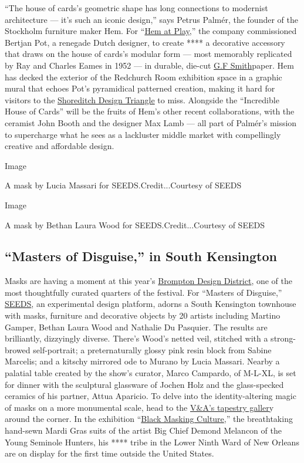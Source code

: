 ``The house of cards's geometric shape has long connections to modernist
architecture --- it's such an iconic design,'' says Petrus Palmér, the
founder of the Stockholm furniture maker Hem. For
``\href{https://www.londondesignfestival.com/event/hem-play}{Hem at
Play},'' the company commissioned Bertjan Pot, a renegade Dutch
designer, to create **** a decorative accessory that draws on the house
of cards's modular form --- most memorably replicated by Ray and Charles
Eames in 1952 --- in durable, die-cut
\href{https://www.gfsmith.com/}{G.F Smith}paper. Hem has decked the
exterior of the Redchurch Room exhibition space in a graphic mural that
echoes Pot's pyramidical patterned creation, making it hard for visitors
to the \href{https://www.shoreditchdesigntriangle.com/}{Shoreditch
Design Triangle} to miss. Alongside the ``Incredible House of Cards''
will be the fruits of Hem's other recent collaborations, with the
ceramist John Booth and the designer Max Lamb --- all part of Palmér's
mission to supercharge what he sees as a lackluster middle market with
compellingly creative and affordable design.

Image

A mask by Lucia Massari for SEEDS.Credit...Courtesy of SEEDS

Image

A mask by Bethan Laura Wood for SEEDS.Credit...Courtesy of SEEDS

\hypertarget{masters-of-disguise-in-south-kensington}{%
\subsection{``Masters of Disguise,'' in South
Kensington}\label{masters-of-disguise-in-south-kensington}}

Masks are having a moment at this year's
\href{https://bromptondesigndistrict.com/}{Brompton Design District},
one of the most thoughtfully curated quarters of the festival. For
``Masters of Disguise,''
\href{https://www.nytimes3xbfgragh.onion/2018/04/30/t-magazine/design/nathalie-assi-seeds-gallery.html}{SEEDS},
an experimental design platform, adorns a South Kensington townhouse
with masks, furniture and decorative objects by 20 artists including
Martino Gamper, Bethan Laura Wood and Nathalie Du Pasquier. The results
are brilliantly, dizzyingly diverse. There's Wood's netted veil,
stitched with a strong-browed self-portrait; a preternaturally glossy
pink resin block from Sabine Marcelis; and a kitschy mirrored ode to
Murano by Lucia Massari. Nearby a palatial table created by the show's
curator, Marco Campardo, of M-L-XL, is set for dinner with the
sculptural glassware of Jochen Holz and the glass-specked ceramics of
his partner, Attua Aparicio. To delve into the identity-altering magic
of masks on a more monumental scale, head to the
\href{https://www.vam.ac.uk/collections/tapestry}{V\&A's tapestry
galler}y around the corner. In the exhibition
``\href{https://www.vam.ac.uk/event/rKRpwj5N/bras-coupe-ldf-installation-sept-2019}{Black
Masking Culture},'' the breathtaking hand-sewn Mardi Gras suits of the
artist Big Chief Demond Melancon of the Young Seminole Hunters, his ****
tribe in the Lower Ninth Ward of New Orleans are on display for the
first time outside the United States.

